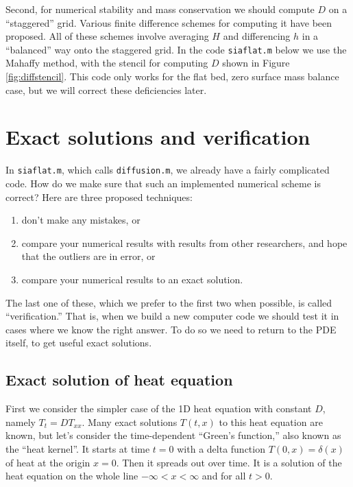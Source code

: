 \documentclass[letterpaper,final,12pt,reqno]{amsart}
\newcommand{\minput}[1]{
\vspace{0.8cm}
\VerbatimInput[frame=single,framesep=3mm,label=\fbox{\normalsize \textsl{\,#1.m\,}},fontfamily=courier,fontsize=\footnotesize]{tmp/#1.slim.m}
\vspace{0.5cm}
}
\begin{document}
Second, for numerical stability and mass conservation we should compute $D$ on a ``staggered'' grid.  Various finite difference schemes for computing it have been proposed.  All of these schemes involve averaging $H$ and differencing $h$ in a ``balanced'' way onto the staggered grid.  In the code \texttt{siaflat.m} below we use the Mahaffy \cite{Mahaffy} method, with the stencil for computing $D$ shown in Figure \ref{fig:diffstencil}.  This code only works for the flat bed, zero surface mass balance case, but we will correct these deficiencies later.

\minput{siaflat}


\section{Exact solutions and verification} \label{sec:exactsolutions}

In \texttt{siaflat.m}, which calls \texttt{diffusion.m}, we already have a fairly complicated code.  How do we make sure that such an implemented numerical scheme is correct?  Here are three proposed techniques:
\begin{enumerate}
  \item don't make any mistakes, or
  \item compare your numerical results with results from other researchers, and hope that the outliers are in error, or
  \item compare your numerical results to an exact solution.   \end{enumerate}
The last one of these, which we prefer to the first two when possible, is called ``verification.''  That is, when we build a new computer code we should test it in cases where we know the right answer.  To do so we need to return to the PDE itself, to get useful exact solutions.

\subsection*{Exact solution of heat equation}  First we consider the simpler case of the 1D heat equation with constant $D$, namely $T_t = D T_{xx}$.  Many exact solutions $T(t,x)$ to this heat equation are known, but let's consider the time-dependent ``Green's function,'' also known as the ``heat kernel''.  It starts at time $t=0$ with a delta function $T(0,x)=\delta(x)$ of heat at the origin $x=0$.  Then it spreads out over time.  It is a solution of the heat equation on the whole line $-\infty<x<\infty$ and for all $t>0$.
\end{document}
